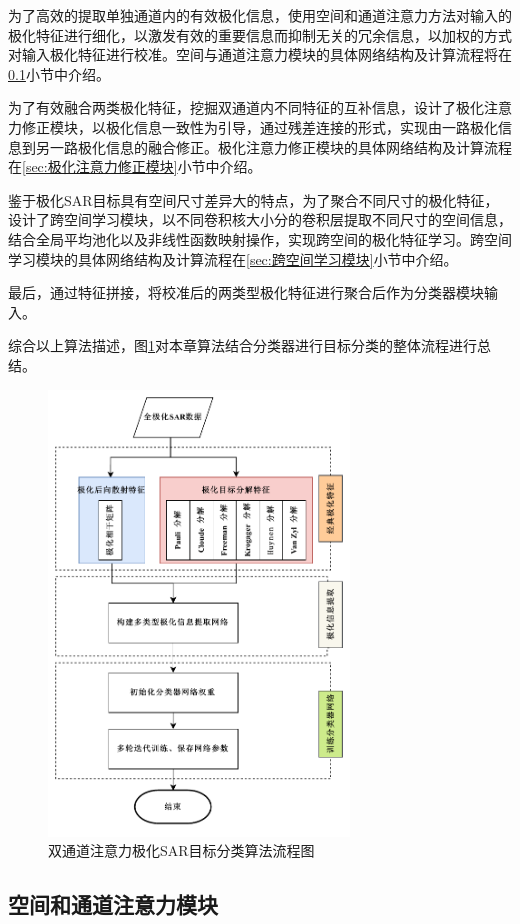 为了高效的提取单独通道内的有效极化信息，使用空间和通道注意力方法对输入的极化特征进行细化，以激发有效的重要信息而抑制无关的冗余信息，以加权的方式对输入极化特征进行校准。空间与通道注意力模块的具体网络结构及计算流程将在\ref{sec:空间和通道注意力模块}小节中介绍。

为了有效融合两类极化特征，挖掘双通道内不同特征的互补信息，设计了极化注意力修正模块，以极化信息一致性为引导，通过残差连接的形式，实现由一路极化信息到另一路极化信息的融合修正。极化注意力修正模块的具体网络结构及计算流程在\ref{sec:极化注意力修正模块}小节中介绍。

鉴于极化SAR目标具有空间尺寸差异大的特点，为了聚合不同尺寸的极化特征，设计了跨空间学习模块，以不同卷积核大小分的卷积层提取不同尺寸的空间信息，结合全局平均池化以及非线性函数映射操作，实现跨空间的极化特征学习。跨空间学习模块的具体网络结构及计算流程在\ref{sec:跨空间学习模块}小节中介绍。

最后，通过特征拼接，将校准后的两类型极化特征进行聚合后作为分类器模块输入。

综合以上算法描述，图\ref{流程图}对本章算法结合分类器进行目标分类的整体流程进行总结。
\begin{figure}[ht!]
    \centering
    \includegraphics[width=8cm]{pic/chapter3/DP流程图.pdf}
    \caption{双通道注意力极化SAR目标分类算法流程图}
    \label{流程图}
\end{figure}

\subsection{空间和通道注意力模块}
\label{sec:空间和通道注意力模块}

